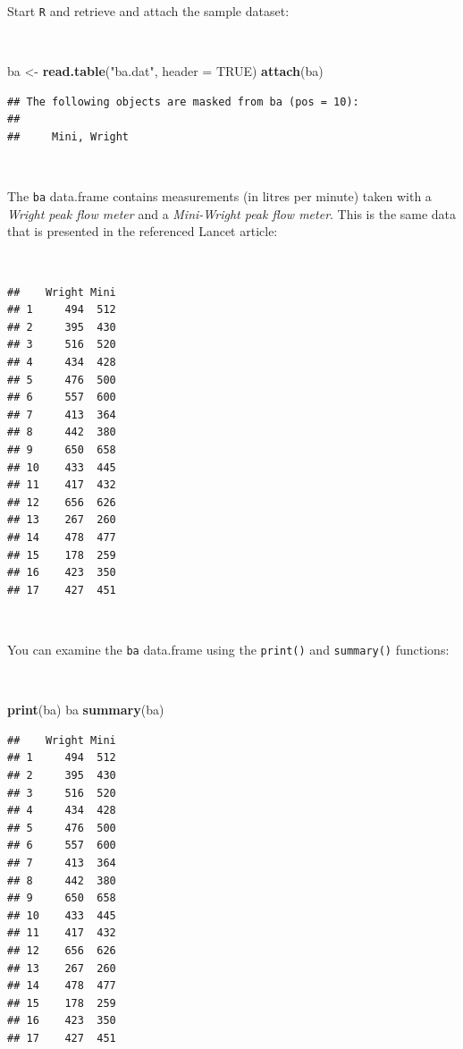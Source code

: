 \documentclass[12pt,a4paper]{book}
\newenvironment{Shaded}{\begin{snugshade}}{\end{snugshade}}
\newcommand{\KeywordTok}[1]{\textcolor[rgb]{0.13,0.29,0.53}{\textbf{#1}}}
\newcommand{\DataTypeTok}[1]{\textcolor[rgb]{0.13,0.29,0.53}{#1}}
\newcommand{\StringTok}[1]{\textcolor[rgb]{0.31,0.60,0.02}{#1}}
\newcommand{\OtherTok}[1]{\textcolor[rgb]{0.56,0.35,0.01}{#1}}
\newcommand{\NormalTok}[1]{#1}
\theoremstyle{definition}
\theoremstyle{definition}
\theoremstyle{definition}
\theoremstyle{remark}
\begin{document}
Start \texttt{R} and retrieve and attach the sample dataset:

~

\begin{Shaded}
\begin{Highlighting}[]
\NormalTok{ba <-}\StringTok{ }\KeywordTok{read.table}\NormalTok{(}\StringTok{"ba.dat"}\NormalTok{, }\DataTypeTok{header =} \OtherTok{TRUE}\NormalTok{)}
\KeywordTok{attach}\NormalTok{(ba)}
\end{Highlighting}
\end{Shaded}

\begin{verbatim}
## The following objects are masked from ba (pos = 10):
## 
##     Mini, Wright
\end{verbatim}

~

The \texttt{ba} data.frame contains measurements (in litres per minute)
taken with a \emph{Wright peak flow meter} and a \emph{Mini-Wright peak
flow meter}. This is the same data that is presented in the referenced
Lancet article:

~

\begin{verbatim}
##    Wright Mini
## 1     494  512
## 2     395  430
## 3     516  520
## 4     434  428
## 5     476  500
## 6     557  600
## 7     413  364
## 8     442  380
## 9     650  658
## 10    433  445
## 11    417  432
## 12    656  626
## 13    267  260
## 14    478  477
## 15    178  259
## 16    423  350
## 17    427  451
\end{verbatim}

~

You can examine the \texttt{ba} data.frame using the \texttt{print()}
and \texttt{summary()} functions:

~

\begin{Shaded}
\begin{Highlighting}[]
\KeywordTok{print}\NormalTok{(ba)}
\NormalTok{ba}
\KeywordTok{summary}\NormalTok{(ba)}
\end{Highlighting}
\end{Shaded}

\begin{verbatim}
##    Wright Mini
## 1     494  512
## 2     395  430
## 3     516  520
## 4     434  428
## 5     476  500
## 6     557  600
## 7     413  364
## 8     442  380
## 9     650  658
## 10    433  445
## 11    417  432
## 12    656  626
## 13    267  260
## 14    478  477
## 15    178  259
## 16    423  350
## 17    427  451
\end{verbatim}
\end{document}
